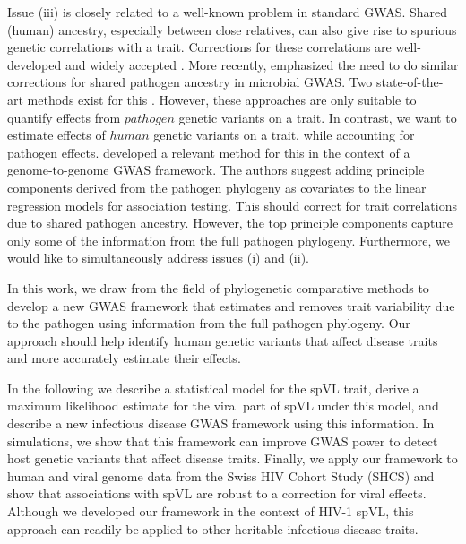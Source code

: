 \documentclass[11pt]{article}
\begin{document}
\begin{linenumbers}
Issue (iii) is closely related to a well-known problem in standard GWAS. Shared (human) ancestry, especially between close relatives, can also give rise to spurious genetic correlations with a trait. Corrections for these correlations are well-developed and widely accepted  \citep{Astle2009, Price2006}. More recently, \citet{Power2017} emphasized the need to do similar corrections for shared pathogen ancestry in microbial GWAS. Two state-of-the-art methods exist for this \citep{Earle2016, collins_phylogenetic_nodate}. 
However, these approaches are only suitable to quantify effects from $pathogen$ genetic variants on a trait. In contrast, we want to estimate effects of $human$ genetic variants on a trait, while accounting for pathogen effects. \citet{Naret2018} developed a relevant method for this in the context of a genome-to-genome GWAS framework. The authors suggest adding principle components derived from the pathogen phylogeny as covariates to the linear regression models for association testing. This should correct for trait correlations due to shared pathogen ancestry. However, the top principle components capture only some of the information from the full pathogen phylogeny. Furthermore, we would like to simultaneously address issues (i) and (ii).

In this work,  we draw from the field of phylogenetic comparative methods to develop a new GWAS framework that estimates and removes trait variability due to the pathogen using information from the full pathogen phylogeny. Our approach should help identify human genetic variants that affect disease traits and more accurately estimate their effects.

In the following we describe a statistical model for the spVL trait, derive a maximum likelihood estimate for the viral part of spVL under this model, and describe a new infectious disease GWAS framework using this information. In simulations, we show that this framework can improve GWAS power to detect host genetic variants that affect disease traits. Finally, we apply our framework to human and viral genome data from the Swiss HIV Cohort Study (SHCS) and show that associations with spVL are robust to a correction for viral effects. Although we developed our framework in the context of HIV-1 spVL, this approach can readily be applied to other heritable infectious disease traits. 


\end{linenumbers}
\end{document}
